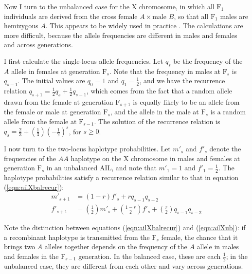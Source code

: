 \documentclass[12pt,letterpaper,pdftex]{article}
\begin{document}
Now I turn to the unbalanced case for the X chromosome, in which all
$\text{F}_1$ individuals are derived from the cross $\text{female } A
\times \text{male } B$, so that all $\text{F}_1$ males are hemizygous
$A$.  This appears to be widely used in practice
\citep[e.g.,][]{Norgard2008, Kelly2010}.  The calculations are more
difficult,  because the allele frequencies are
different in males and females and across generations.

I first calculate the single-locus allele frequencies.
Let $q_s$ be the
frequency of the $A$ allele in females at generation $\text{F}_s$.
Note that the frequency in males at $\text{F}_s$ is $q_{s-1}$.
The initial values are $q_0 = 1$ and $q_1 = \frac{1}{2}$, and we have the
recurrence relation $q_{s+1} = \frac{1}{2}q_s + \frac{1}{2}q_{s-1}$,
which comes from the fact that a random allele drawn from the female
at generation $\text{F}_{s+1}$ is equally likely to be an allele from the
female or male at generation $\text{F}_s$, and the allele in the male
at $\text{F}_s$ is a random allele from the female at $\text{F}_{s-1}$.
The solution of the recurrence relation is $q_s = \frac{2}{3} +
(\frac{1}{3})(-\frac{1}{2})^s$, for $s \ge 0$. 

I now turn to the two-locus haplotype probabilities.  Let $m'_s$ and
$f'_s$ denote the frequencies of the $AA$ haplotype on the X
chromosome in males and
females at generation $\text{F}_s$ in an unbalanced AIL, and note that
$m'_1 = 1$ and $f'_1 = \frac{1}{2}$.  The haplotype probabilities
satisfy a recurrence relation similar to that in equation (\ref{eqn:ailXbalrecur}):
\begin{equation} \begin{split}
m'_{s+1} & = (1-r) f'_s + r q_{s-1} q_{s-2} \\[6pt]
f'_{s+1} & = \textstyle{ \left(\frac{1}{2}\right)m'_s + \left(\frac{1-r}{2}\right)
  f'_s + \left(\frac{r}{2}\right) q_{s-1} q_{s-2} }
\label{eqn:ailXub}
\end{split} \end{equation}

Note the distinction between equations (\ref{eqn:ailXbalrecur}) and
(\ref{eqn:ailXub}):  if a recombinant haplotype is transmitted
from the $\text{F}_s$ female, the chance that it brings two $A$
alleles together depends on the frequency of the $A$ allele in males
and females in the $\text{F}_{s-1}$ generation.  In the balanced case,
these are each $\frac{1}{2}$; in the unbalanced case, they are
different from each other and vary across generations.
\end{document}
